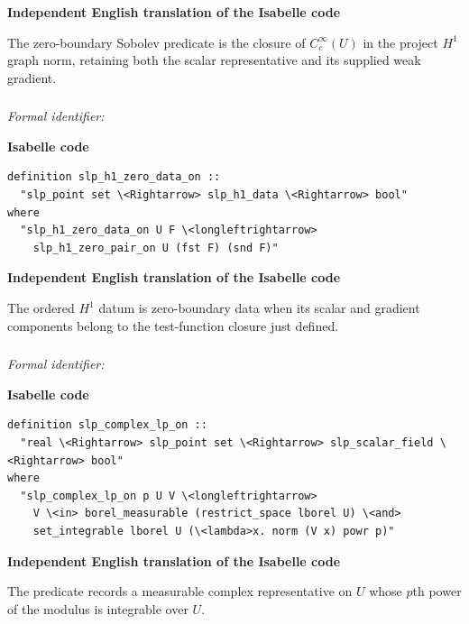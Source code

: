 \documentclass[10pt,oneside]{article}
\newcommand{\reviewlabel}[1]{\par\smallskip\noindent\textsf{\bfseries #1}\par\smallskip}
\begin{document}
\reviewlabel{Independent English translation of the Isabelle code}
The zero-boundary Sobolev predicate is the closure of $C_c^\infty(U)$ in the project $H^1$ graph norm, retaining both the scalar representative and its supplied weak gradient.

\subsubsection{\texttt{}}
\noindent\textit{Formal identifier:} \texttt{}

\reviewlabel{Isabelle code}
\begin{lstlisting}
definition slp_h1_zero_data_on ::
  "slp_point set \<Rightarrow> slp_h1_data \<Rightarrow> bool"
where
  "slp_h1_zero_data_on U F \<longleftrightarrow>
    slp_h1_zero_pair_on U (fst F) (snd F)"
\end{lstlisting}

\reviewlabel{Independent English translation of the Isabelle code}
The ordered $H^1$ datum is zero-boundary data when its scalar and gradient components belong to the test-function closure just defined.

\subsubsection{\texttt{}}
\noindent\textit{Formal identifier:} \texttt{}

\reviewlabel{Isabelle code}
\begin{lstlisting}
definition slp_complex_lp_on ::
  "real \<Rightarrow> slp_point set \<Rightarrow> slp_scalar_field \<Rightarrow> bool"
where
  "slp_complex_lp_on p U V \<longleftrightarrow>
    V \<in> borel_measurable (restrict_space lborel U) \<and>
    set_integrable lborel U (\<lambda>x. norm (V x) powr p)"
\end{lstlisting}

\reviewlabel{Independent English translation of the Isabelle code}
The predicate records a measurable complex representative on $U$ whose $p$th power of the modulus is integrable over $U$.
\end{document}
